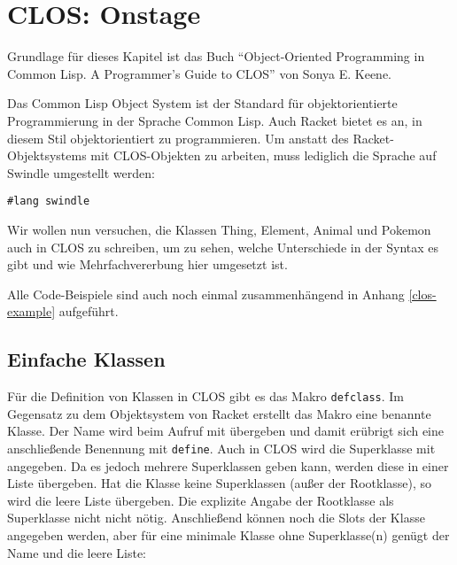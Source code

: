 
\pagestyle{diplHeadings}





\setcounter{page}{1}
\tableofcontents
\cleardoublepage 

\setcounter{page}{1} 
\mainmatter  
{}







\section{CLOS: Onstage}
Grundlage für dieses Kapitel ist das Buch ``Object-Oriented Programming in Common Lisp. A Programmer's Guide to CLOS''\cite{keene} von Sonya E. Keene. 

Das Common Lisp Object System ist der Standard für objektorientierte Programmierung in der Sprache Common Lisp. Auch Racket bietet es an, in diesem Stil objektorientiert zu programmieren. Um anstatt des Racket-Objektsystems mit CLOS-Objekten zu arbeiten, muss lediglich die Sprache auf Swindle umgestellt werden:


\begin{lstlisting}
#lang swindle
\end{lstlisting}

Wir wollen nun versuchen, die Klassen Thing, Element, Animal und Pokemon auch in CLOS zu schreiben, um zu sehen, welche Unterschiede in der Syntax es gibt und wie Mehrfachvererbung hier umgesetzt ist. 

Alle Code-Beispiele sind auch noch einmal zusammenhängend in Anhang \ref{clos-example} aufgeführt.

\subsection{Einfache Klassen}
Für die Definition von Klassen in CLOS gibt es das Makro \texttt{defclass}. Im Gegensatz zu dem Objektsystem von Racket erstellt das Makro eine benannte Klasse. Der Name wird beim Aufruf mit übergeben und damit erübrigt sich eine anschließende Benennung mit \texttt{define}. Auch in CLOS wird die Superklasse mit angegeben. Da es jedoch mehrere Superklassen geben kann, werden diese in einer Liste übergeben. Hat die Klasse keine Superklassen (außer der Rootklasse), so wird die leere Liste übergeben. Die explizite Angabe der Rootklasse als Superklasse nicht nicht nötig. Anschließend können noch die Slots der Klasse angegeben werden, aber für eine minimale Klasse ohne Superklasse(n) genügt der Name und die leere Liste: 

